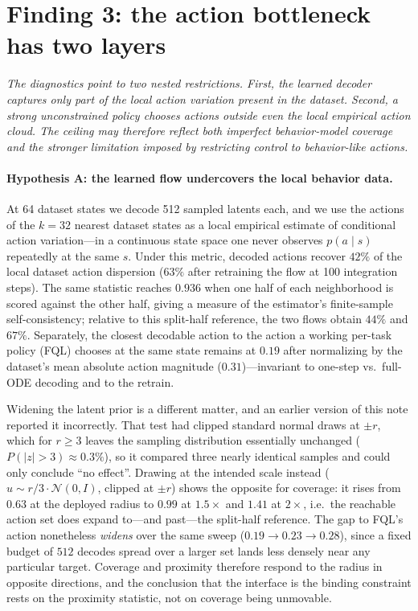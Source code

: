 \documentclass{article}
\begin{document}
\section{Finding 3: the action bottleneck has two layers}
\emph{The diagnostics point to two nested restrictions. First, the learned decoder captures only part of the local action variation present in the dataset. Second, a strong unconstrained policy chooses actions outside even the local empirical action cloud. The ceiling may therefore reflect both imperfect behavior-model coverage and the stronger limitation imposed by restricting control to behavior-like actions.}

\paragraph{Hypothesis A: the learned flow undercovers the local behavior data.} At 64 dataset states we decode 512 sampled latents each, and we use the actions of the $k{=}32$ nearest dataset states as a local empirical estimate of conditional action variation---in a continuous state space one never observes $p(a\mid s)$ repeatedly at the same $s$. Under this metric, decoded actions recover $42\%$ of the local dataset action dispersion ($63\%$ after retraining the flow at 100 integration steps). The same statistic reaches $0.936$ when one half of each neighborhood is scored against the other half, giving a measure of the estimator's finite-sample self-consistency; relative to this split-half reference, the two flows obtain $44\%$ and $67\%$. Separately, the closest decodable action to the action a working per-task policy (FQL) chooses at the same state remains at $0.19$ after normalizing by the dataset's mean absolute action magnitude ($0.31$)---invariant to one-step vs.\ full-ODE decoding and to the retrain.

Widening the latent prior is a different matter, and an earlier version of this note reported it incorrectly. That test had clipped standard normal draws at $\pm r$, which for $r\ge3$ leaves the sampling distribution essentially unchanged ($P(|z|>3)\approx0.3\%$), so it compared three nearly identical samples and could only conclude ``no effect''. Drawing at the intended scale instead ($u\sim r/3\cdot\mathcal{N}(0,I)$, clipped at $\pm r$) shows the opposite for coverage: it rises from $0.63$ at the deployed radius to $0.99$ at $1.5\times$ and $1.41$ at $2\times$, i.e.\ the reachable action set does expand to---and past---the split-half reference. The gap to FQL's action nonetheless \emph{widens} over the same sweep ($0.19\to0.23\to0.28$), since a fixed budget of $512$ decodes spread over a larger set lands less densely near any particular target. Coverage and proximity therefore respond to the radius in opposite directions, and the conclusion that the interface is the binding constraint rests on the proximity statistic, not on coverage being unmovable.
\end{document}
